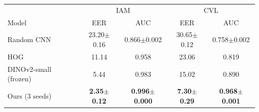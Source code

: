 \begin{tabular}{lcccc}
\toprule
& \multicolumn{2}{c}{IAM} & \multicolumn{2}{c}{CVL} \\
Model & EER & AUC & EER & AUC \\
\midrule
Random CNN & 23.20$\pm$0.16 & 0.866$\pm$0.002 & 30.65$\pm$0.12 & 0.758$\pm$0.002 \\
HOG & 11.14 & 0.958 & 23.06 & 0.819 \\
DINOv2-small (frozen) & 5.44 & 0.983 & 15.02 & 0.890 \\
\midrule
Ours (3 seeds) & \textbf{2.35$\pm$0.12} & \textbf{0.996$\pm$0.000} & \textbf{7.30$\pm$0.29} & \textbf{0.968$\pm$0.001} \\
\bottomrule
\end{tabular}
